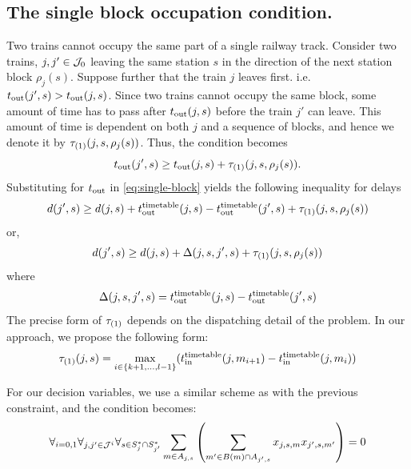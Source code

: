 \subsection{The single block occupation condition.}
Two trains cannot occupy the same part of a single
railway track. Consider two trains, $j, j' \in \mathcal{J}_0$ leaving the same station $s$ in the direction
of the next station block $\rho_j(s)$. Suppose further that the train $j$ leaves first. i.e.
$t_\text{out}(j', s) > t_\text{out}(j, s)$. Since two trains cannot occupy the same block, some amount of time has
to pass after $t_\text{out}(j, s)$ before the train $j'$ can leave. This amount of time is dependent on
both $j$ and a sequence of blocks, and hence we denote it by $\tau_{(1)}(j, s, \rho_j(s))$. Thus, the
condition becomes
\begin{equation}
  \label{eq:single-block}
  t_\text{out}(j', s) \ge t_\text{out}(j, s) + \tau_{(1)}(j, s, \rho_j(s)).
\end{equation}
Substituting for $t_\text{out}$ in \eqref{eq:single-block} yields the following
inequality for delays
\begin{equation}
  \label{eq:single-block-delays}
  d(j', s) \ge d(j, s) + t_\text{out}^\text{timetable}(j, s) - t_\text{out}^\text{timetable}(j', s) + \tau_{(1)}(j, s, \rho_j(s))
\end{equation}
or,
\begin{equation}
  d(j', s) \ge d(j, s) + \Delta(j, s, j', s) + \tau_{(1)}(j, s, \rho_j(s))
\end{equation}
where
\begin{equation}
  \label{eq:delta}
  \Delta(j, s, j', s) = t_\text{out}^\text{timetable}(j, s) - t_\text{out}^\text{timetable}(j', s)
\end{equation}
The precise form of $\tau_{(1)}$ depends on the dispatching detail of the problem.
In our approach, we propose the following form:
\begin{equation}
  \tau_{(1)}(j, s) = \max_{i \in \{k+1,\ldots,l-1\}}(t_\text{in}^\text{timetable}(j, m_{i+1}) - t_\text{in}^\text{timetable}(j, m_i))
\end{equation}

For our decision variables, we use a similar scheme as with the previous constraint, and the
condition becomes:
\begin{equation}
  \label{eq:qubo:singleblock}
  \forall_{i=0,1} \forall_{j, j' \in \mathcal{J}^{i}} \forall_{s \in S^{*}_{j} \cap S^{*}_{j'}} \sum_{m \in A_{j, s}} \left(
    \sum_{m' \in B(m) \cap A_{j', s}} x_{j,s,m}x_{j',s,m'}
  \right) = 0
\end{equation}
